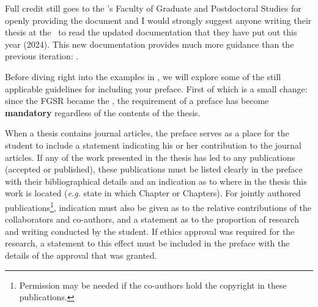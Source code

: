 			Full credit still goes to the \University's Faculty of Graduate and Postdoctoral Studies for openly providing the document and I would strongly suggest anyone writing their thesis at the \University\ to read the updated documentation that they have put out this year (2024).
			This new documentation provides much more guidance than the previous iteration: .

			Before diving right into the examples in , we will explore some of the still applicable guidelines for including your preface. First of which is a small change: since the FGSR became the \Fac, the requirement of a preface has become \textbf{mandatory} regardless of the contents of the thesis.

			When a thesis contains journal articles, the preface serves as a place for the student to include a statement indicating his or her contribution to the journal articles. 
			If any of the work presented in the thesis has led to any publications (accepted or published), these publications must be listed clearly in the preface with their bibliographical details and an indication as to where in the thesis this work is located (\textit{e.g.} state in which Chapter or Chapters). 
			For jointly authored publications\footnote{Permission may be needed if the co-authors hold the copyright in these publications.}, indication must also be given as to the relative contributions of the collaborators and co-authors, and a statement as to the proportion of research and writing conducted by the student.
			If ethics approval was required for the research, a statement to this effect must be included in the preface with the details of the approval that was granted. 




